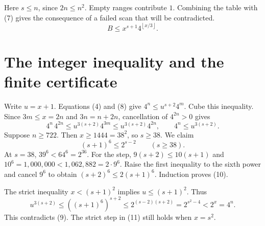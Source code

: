 \documentclass[12pt,letterpaper]{article}
\newcommand{\fl}[1]{\left\lfloor #1\right\rfloor}
\newcommand{\pagepart}{\clearpage}
\begin{document}
Here \(s\le n\), since \(2n\le n^2\). Empty ranges contribute \(1\). Combining the table with (7) gives the consequence of a failed scan that will be contradicted.
\[
 \boxed{\quad B\le x^{s+1}4^{\fl{x/3}}.\quad} \tag{8}\label{eq:gap}
\]
\pagepart\section{The integer inequality and the finite certificate}\label{s:cut}
Write \(u=x+1\). Equations (4) and (8) give \(4^n\le u^{s+2}4^m\). Cube this inequality. Since \(3m\le x=2n\) and \(3n=n+2n\), cancellation of \(4^{2n}>0\) gives
\[
 4^n\,4^{2n}\le u^{3(s+2)}4^{3m}\le u^{3(s+2)}4^{2n},
 \qquad 4^n\le u^{3(s+2)}. \tag{9}
\]
Suppose \(n\ge722\). Then \(x\ge1444=38^2\), so \(s\ge38\). We claim
\[
 (s+1)^6\le 2^{s-2}\qquad(s\ge38). \tag{10}
\]
At \(s=38\), \(39^6<64^6=2^{36}\). For the step, \(9(s+2)\le10(s+1)\) and \(10^6=1{,}000{,}000<1{,}062{,}882=2\cdot9^6\). Raise the first inequality to the sixth power and cancel \(9^6\) to obtain \((s+2)^6\le2(s+1)^6\). Induction proves (10).

The strict inequality \(x<(s+1)^2\) implies \(u\le(s+1)^2\). Thus
\[
 u^{3(s+2)}\le ((s+1)^6)^{s+2}
       \le 2^{(s-2)(s+2)}
       =2^{s^2-4}<2^x=4^n. \tag{11}
\]
This contradicts (9). The strict step in (11) still holds when \(x=s^2\).
\end{document}
